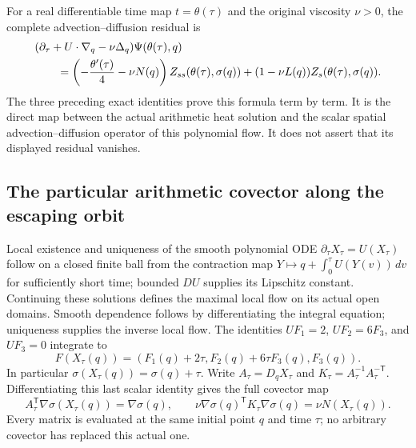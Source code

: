 For a real differentiable time map $t=\theta(\tau)$ and the original
viscosity $\nu>0$, the complete advection--diffusion residual is
\begin{align}
&(\partial_\tau+U\cdot\nabla_q-\nu\Delta_q)
             \Psi(\theta(\tau),q)\notag\\
&\qquad=\left(-\frac{\theta'(\tau)}4-\nu N(q)\right)
                  Z_{ss}(\theta(\tau),\sigma(q))
       +(1-\nu L(q))Z_s(\theta(\tau),\sigma(q)).
\label{eq:eo-full-residual}
\end{align}
The three preceding exact identities prove this formula term by term.
It is the direct map between the actual arithmetic heat solution and
the scalar spatial advection--diffusion operator of this polynomial
flow. It does not assert that its displayed residual vanishes.

\subsection{The particular arithmetic covector along the escaping orbit}

Local existence and uniqueness of the smooth polynomial ODE
$\partial_\tau X_\tau=U(X_\tau)$ follow on a closed finite ball
from the contraction map $Y\mapsto q+\int_0^\tau U(Y(v))\,dv$
for sufficiently short time; bounded $DU$ supplies its Lipschitz
constant. Continuing these solutions defines the maximal local flow
on its actual open domains. Smooth dependence follows by differentiating
the integral equation; uniqueness supplies the inverse local flow.
The identities $UF_1=2$, $UF_2=6F_3$, and $UF_3=0$ integrate to
\[
F(X_\tau(q))=(F_1(q)+2\tau,F_2(q)+6\tau F_3(q),F_3(q)).
\]
In particular $\sigma(X_\tau(q))=\sigma(q)+\tau$. Write
$A_\tau=D_qX_\tau$ and $K_\tau=A_\tau^{-1}A_\tau^{-\mathsf T}$.
Differentiating this last scalar identity gives the full covector map
\[
A_\tau^{\mathsf T}\nabla\sigma(X_\tau(q))=\nabla\sigma(q),\qquad
\nu\nabla\sigma(q)^{\mathsf T}K_\tau\nabla\sigma(q)
       =\nu N(X_\tau(q)).
\]
Every matrix is evaluated at the same initial point $q$ and time
$\tau$; no arbitrary covector has replaced this actual one.

